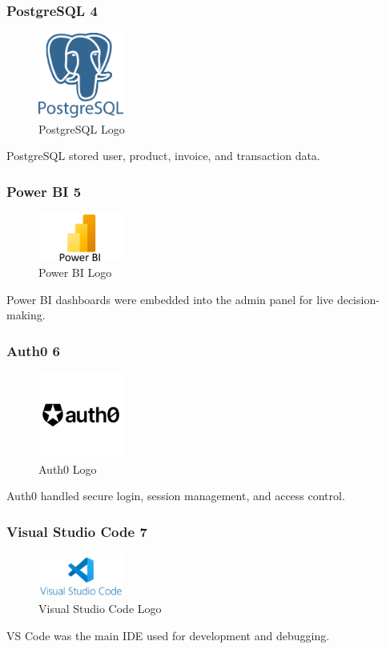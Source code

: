 \subsubsection*{PostgreSQL {4}}
\begin{figure}[H]
  \centering
  \includegraphics[width=0.25\textwidth]{figures/logos/postgresql-logo.png}
  \caption{PostgreSQL Logo}
\end{figure}
PostgreSQL stored user, product, invoice, and transaction data.

\subsubsection*{Power BI {5}}
\begin{figure}[H]
  \centering
  \includegraphics[width=0.25\textwidth]{figures/logos/powerbi-logo.png}
  \caption{Power BI Logo}
\end{figure}
Power BI dashboards were embedded into the admin panel for live decision-making.

\subsubsection*{Auth0 {6}}
\begin{figure}[H]
  \centering
  \includegraphics[width=0.25\textwidth]{figures/logos/auth0-logo.png}
  \caption{Auth0 Logo}
\end{figure}
Auth0 handled secure login, session management, and access control.

\subsubsection*{Visual Studio Code {7}}
\begin{figure}[H]
  \centering
  \includegraphics[width=0.25\textwidth]{figures/logos/vscode-logo.png}
  \caption{Visual Studio Code Logo}
\end{figure}
VS Code was the main IDE used for development and debugging.

